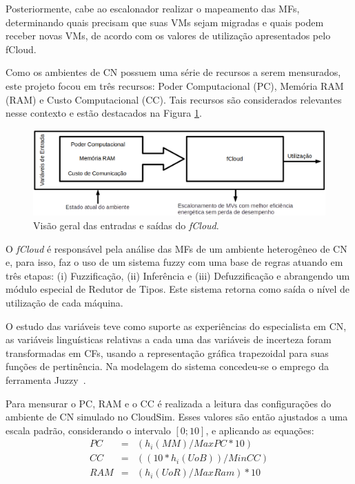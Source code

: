 \documentclass[tcc,capa]{texufpel}
\begin{document}
Posteriormente, cabe ao escalonador realizar o mapeamento das MFs, determinando quais precisam que suas VMs sejam migradas e quais podem receber novas VMs, de acordo com os valores de utilização apresentados pelo fCloud.

Como os ambientes de CN possuem uma série de recursos a serem mensurados, este projeto focou em três recursos: Poder Computacional (PC), Memória RAM (RAM) e Custo Computacional (CC). Tais recursos são considerados relevantes nesse contexto e estão destacados na Figura \ref{modulo_fuzzy_modelagem}.

\begin{figure}[h]
    \centering
    \includegraphics[scale=0.5]{images/modulo_fuzzy_modelagem.png}
    \caption{Visão geral das entradas e saídas do \emph{fCloud}.}
    \label{modulo_fuzzy_modelagem}
\end{figure}

O \emph{fCloud} é responsável pela análise das MFs de um ambiente heterogêneo de CN e, para isso, faz o uso de um sistema fuzzy com uma base de regras atuando em três etapas: (i) Fuzzificação, (ii) Inferência e (iii) Defuzzificação e abrangendo um módulo especial de Redutor de Tipos. Este sistema retorna como saída o nível de utilização de cada máquina.

O estudo das variáveis teve como suporte as experiências do especialista em CN, as variáveis linguísticas relativas a cada uma das variáveis de incerteza foram transformadas em CFs, usando a representação gráfica trapezoidal para suas funções de pertinência. Na modelagem do sistema concedeu-se o emprego da ferramenta Juzzy~\cite{Juzzy2013}.

Para mensurar o PC, RAM e o CC é realizada a leitura das configurações do ambiente de CN simulado no CloudSim. Esses valores são então ajustados a uma escala padrão, considerando o intervalo $[0;10]$, e aplicando as equações:
\begin{eqnarray} 
 PC &=& (h_i(MM) / MaxPC * 10) \label{lblEqCPSS} \\
 CC &=& ((10 * h_i(UoB)) / MinCC) \label{lblEqCCSS} \\
 RAM &=& (h_i(UoR) / MaxRam) * 10  \label{lblEqRAMSS}
\end{eqnarray}
\end{document}
